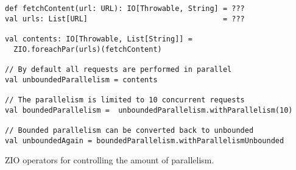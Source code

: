 \begin{algorithm}

\begin{verbatim}
def fetchContent(url: URL): IO[Throwable, String] = ???
val urls: List[URL]                               = ???

val contents: IO[Throwable, List[String]] =
  ZIO.foreachPar(urls)(fetchContent)

// By default all requests are performed in parallel
val unboundedParallelism = contents

// The parallelism is limited to 10 concurrent requests
val boundedParallelism =  unboundedParallelism.withParallelism(10)

// Bounded parallelism can be converted back to unbounded
val unboundedAgain = boundedParallelism.withParallelismUnbounded
\end{verbatim}

\caption{ZIO operators for controlling the amount of parallelism. \label{zio:limit-parallelism}}
\end{algorithm}